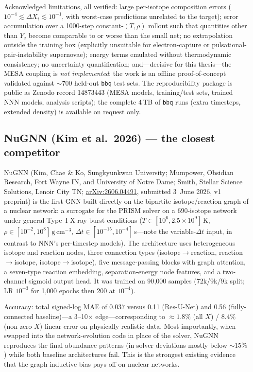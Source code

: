 \documentclass[11pt,a4paper]{article}
\newcommand{\Ye}{\ensuremath{Y_{\mathrm{e}}}}
\newcommand{\code}[1]{\texttt{#1}}
\newcommand{\arxiv}[1]{\href{https://arxiv.org/abs/#1}{arXiv:#1}}
\begin{document}
Acknowledged limitations, all verified: large per-isotope composition errors ($10^{-4} \lesssim \Delta X_i \lesssim 10^{-1}$, with worst-case predictions unrelated to the target); error accumulation over a 1000-step constant-$(T,\rho)$ rollout such that quantities other than \Ye{} become comparable to or worse than the small net; no extrapolation outside the training box (explicitly unsuitable for electron-capture or pulsational-pair-instability supernovae); energy terms emulated without thermodynamic consistency; no uncertainty quantification; and---decisive for this thesis---the MESA coupling is \emph{not implemented}; the work is an offline proof-of-concept validated against ${\sim}700$ held-out \code{bbq} test sets. The reproducibility package is public as Zenodo record 14873443 (MESA models, training/test sets, trained NNN models, analysis scripts); the complete 4\,TB of \code{bbq} runs (extra timesteps, extended density) is available on request only.

\subsection{NuGNN (Kim et al.\ 2026) --- the closest competitor}

NuGNN (Kim, Chae \& Ko, Sungkyunkwan University; Mumpower, Obsidian Research, Fort Wayne IN, and University of Notre Dame; Smith, Stellar Science Solutions, Lenoir City TN; \arxiv{2606.04491}, submitted 3~June 2026, v1 preprint) is the first GNN built directly on the bipartite isotope/reaction graph of a nuclear network: a surrogate for the PRISM solver on a 690-isotope network under general Type~I X-ray-burst conditions ($T \in [10^{6}, 2.5\times10^{9}]$\,K, $\rho \in [10^{-2}, 10^{8}]\,\mathrm{g\,cm^{-3}}$, $\Delta t \in [10^{-15}, 10^{-4}]$\,s---note the variable-$\Delta t$ input, in contrast to NNN's per-timestep models). The architecture uses heterogeneous isotope and reaction nodes, three connection types (isotope$\to$reaction, reaction$\to$isotope, isotope$\to$isotope), five message-passing blocks with graph attention, a seven-type reaction embedding, separation-energy node features, and a two-channel sigmoid output head. It was trained on 90{,}000 samples (72k/9k/9k split; LR $10^{-3}$ for 1{,}000 epochs then 200 at $10^{-4}$).

Accuracy: total signed-log MAE of 0.037 versus 0.11 (Res-U-Net) and 0.56 (fully-connected baseline)---a 3--10$\times$ edge---corresponding to ${\approx}1.8\%$ (all $X$) / 8.4\% (non-zero $X$) linear error on physically realistic data. Most importantly, when swapped into the network-evolution code in place of the solver, NuGNN reproduces the final abundance patterns (in-solver deviations mostly below ${\sim}15\%$) while both baseline architectures fail. This is the strongest existing evidence that the graph inductive bias pays off on nuclear networks.
\end{document}
